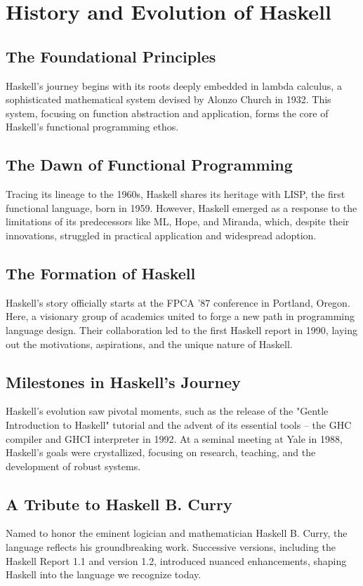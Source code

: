 \documentclass[a4paper, 10pt]{article}
\begin{document}
	\section{History and Evolution of Haskell}
        \subsection{The Foundational Principles}
            Haskell's journey begins with its roots deeply embedded in lambda calculus, a sophisticated mathematical system devised by Alonzo Church in 1932. This system, focusing on function abstraction and application, forms the core of Haskell's functional programming ethos.

        \subsection{The Dawn of Functional Programming}
            Tracing its lineage to the 1960s, Haskell shares its heritage with LISP, the first functional language, born in 1959. However, Haskell emerged as a response to the limitations of its predecessors like ML, Hope, and Miranda, which, despite their innovations, struggled in practical application and widespread adoption.

        \subsection{The Formation of Haskell}
            Haskell's story officially starts at the FPCA '87 conference in Portland, Oregon. Here, a visionary group of academics united to forge a new path in programming language design. Their collaboration led to the first Haskell report in 1990, laying out the motivations, aspirations, and the unique nature of Haskell.

        \subsection{Milestones in Haskell’s Journey}
            Haskell's evolution saw pivotal moments, such as the release of the "Gentle Introduction to Haskell" tutorial and the advent of its essential tools – the GHC compiler and GHCI interpreter in 1992. At a seminal meeting at Yale in 1988, Haskell's goals were crystallized, focusing on research, teaching, and the development of robust systems.

        \subsection{A Tribute to Haskell B. Curry}
            Named to honor the eminent logician and mathematician Haskell B. Curry, the language reflects his groundbreaking work. Successive versions, including the Haskell Report 1.1 and version 1.2, introduced nuanced enhancements, shaping Haskell into the language we recognize today.
\end{document}
